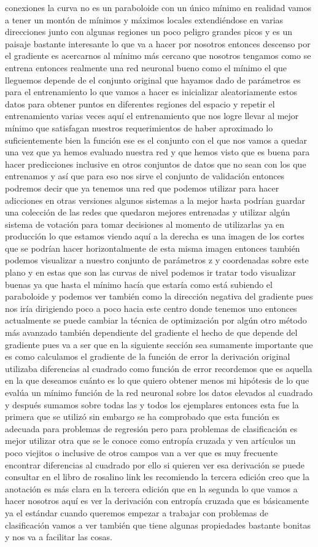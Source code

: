 conexiones la curva no es un paraboloide con un único mínimo en realidad vamos a tener un montón de mínimos y máximos locales extendiéndose en varias direcciones junto con algunas regiones un poco peligro grandes picos y es un paisaje bastante interesante lo que va a hacer por nosotros entonces descenso por el gradiente es acercarnos al mínimo más cercano que nosotros tengamos como se entrena entonces realmente una red neuronal bueno como el mínimo el que lleguemos depende de el conjunto original que hayamos dado de parámetros es para el entrenamiento lo que vamos a hacer es inicializar aleatoriamente estos datos para obtener puntos en diferentes regiones del espacio y repetir el entrenamiento varias veces aquí el entrenamiento que nos logre llevar al mejor mínimo que satisfagan nuestros requerimientos de haber aproximado lo suficientemente bien la función ese es el conjunto con el que nos vamos a quedar una vez que ya hemos evaluado nuestra red y que hemos visto que es buena para hacer predicciones inclusive en otros conjuntos de datos que no sean con los que entrenamos y así que para eso nos sirve el conjunto de validación entonces podremos decir que ya tenemos una red que podemos utilizar para hacer adicciones en otras versiones algunos sistemas a la mejor hasta podrían guardar una colección de las redes que quedaron mejores entrenadas y utilizar algún sistema de votación para tomar decisiones al momento de utilizarlas ya en producción lo que estamos viendo aquí a la derecha es una imagen de los cortes que se podrían hacer horizontalmente de esta misma imagen entonces también podemos visualizar a nuestro conjunto de parámetros z y coordenadas sobre este plano y en estas que son las curvas de nivel podemos ir tratar todo visualizar buenas ya que hasta el mínimo hacía que estaría como está subiendo el paraboloide y podemos ver también como la dirección negativa del gradiente pues nos iría dirigiendo poco a poco hacia este centro donde tenemos uno entonces actualmente se puede cambiar la técnica de optimización por algún otro método más avanzado también dependiente del gradiente el hecho de que depende del gradiente pues va a ser que en la siguiente sección sea sumamente importante que es como calculamos el gradiente de la función de error la derivación original utilizaba diferencias al cuadrado como función de error recordemos que es aquella en la que deseamos cuánto es lo que quiero obtener menos mi hipótesis de lo que evalúa un mínimo función de la red neuronal sobre los datos elevados al cuadrado y después sumamos sobre todas las y todos los ejemplares entonces esta fue la primera que se utilizó sin embargo se ha comprobado que esta función es adecuada para problemas de regresión pero para problemas de clasificación es mejor utilizar otra que se le conoce como entropía cruzada y ven artículos un poco viejitos o inclusive de otros campos van a ver que es muy frecuente encontrar diferencias al cuadrado por ello si quieren ver esa derivación se puede consultar en el libro de rosalino link les recomiendo la tercera edición creo que la anotación es más clara en la tercera edición que en la segunda lo que vamos a hacer nosotros aquí es ver la derivación con entropía cruzada que es básicamente ya el estándar cuando queremos empezar a trabajar con problemas de clasificación vamos a ver también que tiene algunas propiedades bastante bonitas y nos va a facilitar las cosas.
